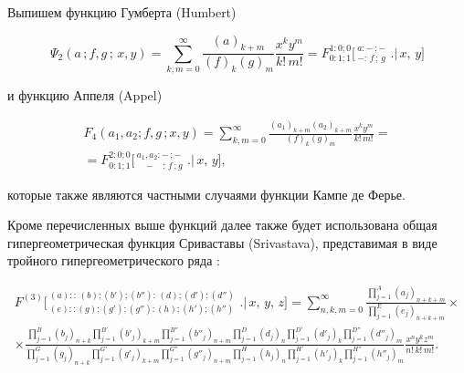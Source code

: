Выпишем функцию Гумберта  (Humbert)

\begin{equation}

\label{monako:Humbert}

\Psi_2(a\,;f,g\,;\,x,y)=\sum_{k,m=0}^\infty\frac{(a)_{k+m}}{(f)_k(g)_m}\frac{x^k y^m}{k!\,m!}=F_{0:1;1}^{1:0;0}\bigg[\,^{\displaystyle a:-\,;-}_{\displaystyle -\!:\,f\,;\,g}\,\,\bigg.\bigg|\,x,\,y\bigg]

\end{equation}

и функцию Аппеля (Appel)

\begin{multline}

\label{monako:Appel}

F_4(a_1,a_2;f,g\,;x,y)=\sum_{k,m=0}^\infty\frac{(a_1)_{k+m}(a_2)_{k+m}}{(f)_k(g)_m}\frac{x^k y^m}{k!\,m!}= \\ =F_{0:1;1}^{2:0;0}\bigg[\,^{\displaystyle a_1,a_2:-\,;-}_{\displaystyle \,\,\,\,\,-\,\,\,\,\,:\,f\,;g}\,\,\bigg.\bigg|\,x,\,y\bigg],

\end{multline}

которые также являются частными случаями функции  Кампе де Ферье.



Кроме перечисленных выше функций далее также будет использована общая гипергеометрическая функция Сриваставы (Srivastava), представимая в виде тройного гипергеометрического ряда \cite{manako:srivastava}:

\begin{multline*}

F^{(3)}\bigg[\,^{\displaystyle (a)::\,(b);(b');(b''):\,(d);(d');(d'')}_{\displaystyle (e)::(g);(g');(g''):(h);(h');(h'')}\,\,\bigg.\bigg|\,x,\,y,\,z\bigg]= \sum_{n,k,m=0}^\infty \frac{\prod\limits_{\scriptscriptstyle j=1}^{\scriptscriptstyle A} (a_j)_{n+k+m}  }{\prod\limits_{\scriptscriptstyle j=1}^{\scriptscriptstyle E} (e_j)_{n+k+m}  } \times\\

\times\frac{\prod\limits_{\scriptscriptstyle j=1}^{\scriptscriptstyle B} (b_j)_{n+k} \prod\limits_{\scriptscriptstyle j=1}^{\scriptscriptstyle B'} (b'_j)_{k+m} \prod\limits_{\scriptscriptstyle j=1}^{\scriptscriptstyle B''} (b''_j)_{n+m} \prod\limits_{\scriptscriptstyle j=1}^{\scriptscriptstyle D} (d_j)_{n} \prod\limits_{\scriptscriptstyle j=1}^{\scriptscriptstyle D'} (d'_j)_{k}  \prod\limits_{\scriptscriptstyle j=1}^{\scriptscriptstyle D''} (d''_j)_{m} }                                                                      {\prod\limits_{\scriptscriptstyle j=1}^{\scriptscriptstyle G} (g_j)_{n+k} \prod\limits_{\scriptscriptstyle j=1}^{\scriptscriptstyle G'} (g'_j)_{k+m} \prod\limits_{\scriptscriptstyle j=1}^{\scriptscriptstyle G''} (g''_j)_{n+m} \prod\limits_{\scriptscriptstyle j=1}^{\scriptscriptstyle H} (h_j)_{n} \prod\limits_{\scriptscriptstyle j=1}^{\scriptscriptstyle H'} (h'_j)_{k}  \prod\limits_{\scriptscriptstyle j=1}^{\scriptscriptstyle H''} (h''_j)_{m} } \frac{x^ny^kz^m}{n!\,k!\,m!}.

\end{multline*}


